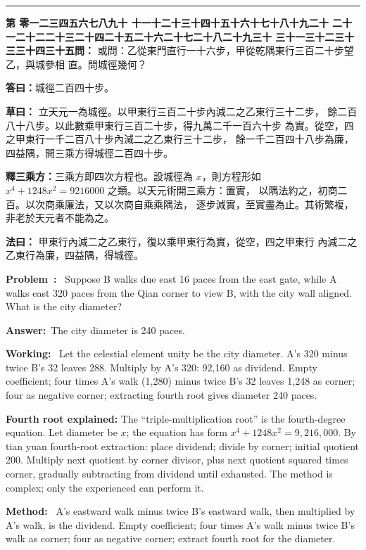 \documentclass[9pt,a4paper]{article}
\newcounter{probnum}
\newcounter{overallnum}
\newcommand{\chnum}[1]{%
  \ifcase#1 零\or 一\or 二\or 三\or 四\or 五\or 六\or 七\or 八\or 九\or 十\or
    十一\or 十二\or 十三\or 十四\or 十五\or 十六\or 十七\or 十八\or 十九\or 二十\or
    二十一\or 二十二\or 二十三\or 二十四\or 二十五\or 二十六\or 二十七\or 二十八\or 二十九\or 三十\or
    三十一\or 三十二\or 三十三\or 三十四\or 三十五\fi}
\newcommand{\problem}[1]{\stepcounter{probnum}\stepcounter{overallnum}\par\noindent\textbf{\color{volcolor}第\chnum{\value{probnum}}問：}#1\par\vspace{0.15cm}}
\newcommand{\answer}[1]{\par\noindent\textbf{答曰：}#1\par\vspace{0.15cm}}
\newcommand{\working}[1]{\par\noindent\textbf{草曰：}#1\par\vspace{0.15cm}}
\newcommand{\method}[1]{\par\noindent\textbf{法曰：}#1\par\vspace{0.25cm}}
\newcommand{\eproblem}[1]{\par\noindent\textbf{\color{volcolor}Problem~\theoverallnum:}~#1\par\vspace{0.15cm}}
\newcommand{\eanswer}[1]{\par\noindent\textbf{Answer:}~#1\par\vspace{0.15cm}}
\newcommand{\eworking}[1]{\par\noindent\textbf{Working:}~#1\par\vspace{0.15cm}}
\newcommand{\emethod}[1]{\par\noindent\textbf{Method:}~#1\par\vspace{0.25cm}}
\begin{document}
\vspace{0.15cm}
\noindent\rule{\textwidth}{0.2pt}
\vspace{0.15cm}

\noindent\begin{minipage}[t]{0.48\textwidth}
\problem{
或問：乙從東門直行一十六步，甲從乾隅東行三百二十步望乙，與城參相
直。問城徑幾何？
}

\answer{城徑二百四十步。}

\working{
立天元一為城徑。以甲東行三百二十步內減二之乙東行三十二步，
餘二百八十八步。以此數乘甲東行三百二十步，得九萬二千一百六十步
為實。從空，四之甲東行一千二百八十步內減二之乙東行三十二步，
餘一千二百四十八步為廉，四益隅，開三乘方得城徑二百四十步。

\textbf{釋三乘方：}三乘方即四次方程也。設城徑為 $x$，則方程形如
$x^4 + 1248x^2 = 9216000$ 之類。以天元術開三乘方：置實，
以隅法約之，初商二百。以次商乘廉法，又以次商自乘乘隅法，
逐步減實，至實盡為止。其術繁複，非老於天元者不能為之。
}

\method{
甲東行內減二之乙東行，復以乘甲東行為實，從空，四之甲東行
內減二之乙東行為廉，四益隅，得城徑。
}
\end{minipage}%
\hfill%
\begin{minipage}[t]{0.50\textwidth}
\eproblem{
Suppose B walks due east 16 paces from the east gate, while A walks east 320
paces from the Qian corner to view B, with the city wall aligned. What is
the city diameter?
}

\eanswer{The city diameter is 240 paces.}

\eworking{
Let the celestial element unity be the city diameter. A's 320 minus twice
B's 32 leaves 288. Multiply by A's 320: 92,160 as dividend. Empty coefficient;
four times A's walk (1,280) minus twice B's 32 leaves 1,248 as corner;
four as negative corner; extracting fourth root gives diameter 240 paces.

\textbf{Fourth root explained:} The ``triple-multiplication root'' is the
fourth-degree equation. Let diameter be $x$; the equation has form
$x^4 + 1248x^2 = 9{,}216{,}000$. By tian yuan fourth-root extraction: place
dividend; divide by corner; initial quotient 200. Multiply next quotient by
corner divisor, plus next quotient squared times corner, gradually subtracting
from dividend until exhausted. The method is complex; only the experienced
can perform it.
}

\emethod{
A's eastward walk minus twice B's eastward walk, then multiplied by A's walk,
is the dividend. Empty coefficient; four times A's walk minus twice B's walk
as corner; four as negative corner; extract fourth root for the diameter.
}
\end{minipage}
\vspace{0.15cm}
\end{document}
